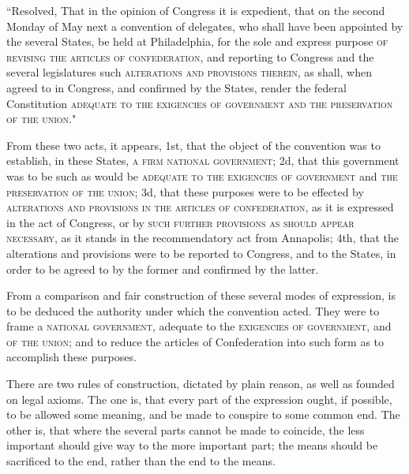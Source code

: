``Resolved, That in the opinion of Congress it is expedient, that on the second Monday of May next a convention of delegates, who shall have been appointed by the several States, be held at Philadelphia, for the sole and express purpose \textsc{of revising the articles of confederation}, and reporting to Congress and the several legislatures such \textsc{alterations and provisions therein}, as shall, when agreed to in Congress, and confirmed by the States, render the federal Constitution \textsc{adequate to the exigencies of government and the preservation of the union}."

From these two acts, it appears, 1st, that the object of the convention was to establish, in these States, \textsc{a firm national government}; 2d, that this government was to be such as would be \textsc{adequate to the exigencies of government} and \textsc{the preservation of the union}; 3d, that these purposes were to be effected by \textsc{alterations and provisions in the articles of confederation}, as it is expressed in the act of Congress, or by \textsc{such further provisions as should appear necessary}, as it stands in the recommendatory act from Annapolis; 4th, that the alterations and provisions were to be reported to Congress, and to the States, in order to be agreed to by the former and confirmed by the latter.

From a comparison and fair construction of these several modes of expression, is to be deduced the authority under which the convention acted. 
They were to frame a \textsc{national government}, adequate to the \textsc{exigencies of government}, and \textsc{of the union}; and to reduce the articles of Confederation into such form as to accomplish these purposes.

There are two rules of construction, dictated by plain reason, as well as founded on legal axioms. 
The one is, that every part of the expression ought, if possible, to be allowed some meaning, and be made to conspire to some common end. 
The other is, that where the several parts cannot be made to coincide, the less important should give way to the more important part; the means should be sacrificed to the end, rather than the end to the means.

